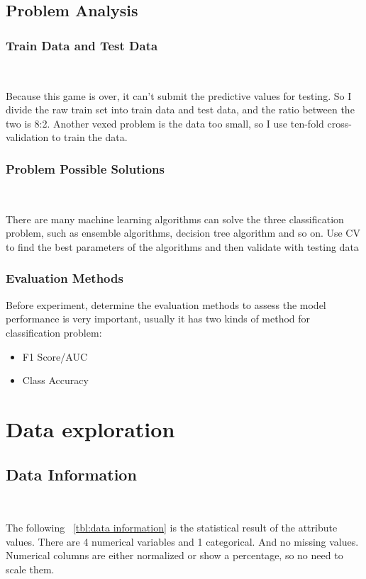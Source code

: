 \subsection{Problem Analysis}

\subsubsection{Train Data and Test Data}
\

Because this game is over, 
it can't submit the predictive values for testing. 
So I divide the raw train set into train data and test data, 
and the ratio between the two is 8:2. 
Another vexed problem is the data too small, 
so I use ten-fold cross-validation 
to train the data.


\subsubsection{Problem Possible Solutions}
\

There are many machine learning algorithms 
can solve the three classification problem,
such as ensemble algorithms,
decision tree algorithm and so on.
Use CV to find the best parameters of the algorithms 
and then validate with testing data 


\subsubsection{Evaluation Methods}


Before experiment, determine the evaluation methods
to assess the model performance is very important,
usually it has two kinds of method for classification problem:

\begin{itemize}
	\item F1 Score/AUC
	\item Class Accuracy
\end{itemize} 


\section{Data exploration} \label{sec-data_exploration}

\subsection{Data Information}
\

The following  ~\cref{tbl:data information}
is the statistical result of the attribute values.
There are 4 numerical variables and 1 categorical. 
And no missing values.
Numerical columns are either normalized or show a percentage, 
so no need to scale them. 

